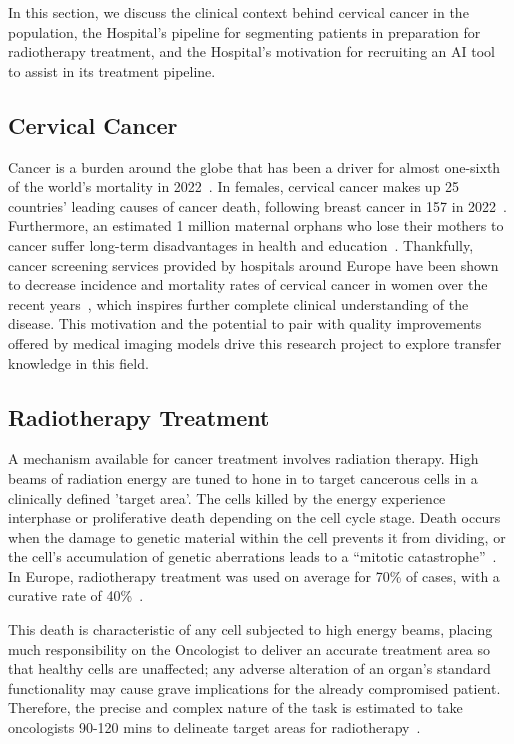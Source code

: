\documentclass[12pt,twoside]{report}
\begin{document}
In this section, we discuss the clinical context behind cervical cancer in the population, the Hospital's pipeline for segmenting patients in preparation for radiotherapy treatment, and the Hospital's motivation for recruiting an AI tool to assist in its treatment pipeline. 

\subsection{Cervical Cancer}\label{sect:cervical-cancer}

Cancer is a burden around the globe that has been a driver for almost one-sixth of the world's mortality in 2022~\cite{Global-cancer-2022}. In females, cervical cancer makes up 25 countries' leading causes of cancer death, following breast cancer in 157 in 2022~\cite{Global-cancer-2022}. Furthermore, an estimated 1 million maternal orphans who lose their mothers to cancer suffer long-term disadvantages in health and education~\cite{Guida2022}. Thankfully, cancer screening services provided by hospitals around Europe have been shown to decrease incidence and mortality rates of cervical cancer in women over the recent years~\cite{Global-cancer-2022}, which inspires further complete clinical understanding of the disease. This motivation and the potential to pair with quality improvements offered by medical imaging models drive this research project to explore transfer knowledge in this field.


\subsection{Radiotherapy Treatment}

A mechanism available for cancer treatment involves radiation therapy. High beams of radiation energy are tuned to hone in to target cancerous cells in a clinically defined 'target area'. The cells killed by the energy experience interphase or proliferative death depending on the cell cycle stage. Death occurs when the damage to genetic material within the cell prevents it from dividing, or the cell's accumulation of genetic aberrations leads to a ``mitotic catastrophe''~\cite{cell-death}. In Europe, radiotherapy treatment was used on average for 70\% of cases, with a curative rate of 40\%~\cite{radiotherapy-advances, Thompson2018}.

This death is characteristic of any cell subjected to high energy beams, placing much responsibility on the Oncologist to deliver an accurate treatment area so that healthy cells are unaffected; any adverse alteration of an organ's standard functionality may cause grave implications for the already compromised patient. Therefore, the precise and complex nature of the task is estimated to take oncologists 90-120 mins to delineate target areas for radiotherapy~\cite{LIU2020184}.
\end{document}
